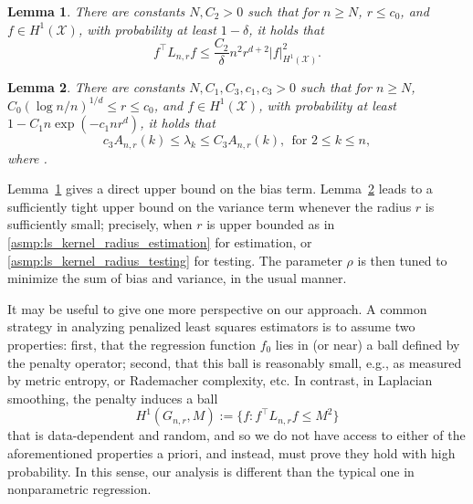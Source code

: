 \documentclass[twoside]{article}
\newcommand{\1}{\mathbf{1}}
\newcommand{\Lap}{L}
\newcommand{\Xset}{\mathcal{X}}
\newtheorem{lemma}{Lemma}
\theoremstyle{definition}
\theoremstyle{remark}
\begin{document}
\begin{lemma}
	\label{lem:graph_sobolev_seminorm}
  There are constants $N,C_2 > 0$ such that for $n \geq N$, $r \leq c_0$, and $f \in H^1(\Xset)$, with probability at least $1 - \delta$, it holds that
	\begin{equation}
	\label{eqn:graph_sobolev_seminorm}
	f^\top \Lap_{n,r} f \leq \frac{C_2}{\delta} n^2 r^{d + 2} |f|_{H^1(\Xset)}^2.
	\end{equation}
\end{lemma}

\begin{lemma}
	\label{lem:neighborhood_eigenvalue} 
  There are constants $N,C_1,C_3,c_1,c_3 > 0$ such that for $n \geq N$, $C_0(\log n/n)^{1/d} \leq r \leq c_0$, and $f \in H^1(\Xset)$, with probability at least $1 - C_1n\exp(-c_1nr^d)$, it holds that
	\begin{equation}
	\label{eqn:neighborhood_eigenvalue}
	c_3A_{n,r}(k) \leq \lambda_k \leq C_3A_{n,r}(k), ~~\textrm{for $2 \leq k \leq n$},
	\end{equation}
where .
\end{lemma}

Lemma~\ref{lem:graph_sobolev_seminorm} gives a direct upper bound on the bias term. Lemma~\ref{lem:neighborhood_eigenvalue} leads to a sufficiently tight upper bound on the variance term whenever the radius $r$ is sufficiently small; precisely, when $r$ is upper bounded as in \ref{asmp:ls_kernel_radius_estimation} for estimation, or \ref{asmp:ls_kernel_radius_testing} for testing. The parameter $\rho$ is then tuned to minimize the sum of bias and variance, in the usual manner.

It may be useful to give one more perspective on our approach. A common strategy in analyzing penalized least squares estimators is to assume two properties: first, that the regression function $f_0$ lies in (or near) a ball defined by the penalty operator; second, that this ball is reasonably small, e.g., as measured by metric entropy, or Rademacher complexity, etc. In contrast, in Laplacian smoothing, the penalty induces a ball
\begin{equation*}
H^1(G_{n,r},M) := \{f: f^\top \Lap_{n,r} f \leq M^2\}
\end{equation*}
that is data-dependent and random, and so we do not have access to either of the aforementioned properties a priori, and instead, must prove they hold with high probability. In this sense, our analysis is different than the typical one in nonparametric regression.
\end{document}
